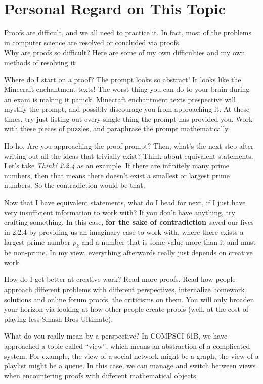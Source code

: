 \section{Personal Regard on This Topic}
Proofs are difficult, and we all need to practice it. In fact, most of the problems in computer science are resolved or concluded via proofs. \\
Why are proofs so difficult? Here are some of my own difficulties and my own methods of resolving it:
\begin{bindenum}
    \item Where do I start on a proof? The prompt looks so abstract! It looks like the Minecraft enchantment texts!
    \subitem The worst thing you can do to your brain during an exam is making it panick. Minecraft enchantment texts prespective will mystify the prompt, and possibly discourage you from approaching it. At these times, try just listing out every single thing the prompt has provided you. Work with these pieces of puzzles, and paraphrase the prompt mathematically.
    \item Ho-ho. Are you approaching the proof prompt? Then, what's the next step after writing out all the ideas that trivially exist?
    \subitem Think about equivalent statements. Let's take \textit{Think! 2.2.4} as an example. If there are infinitely many prime numbers, then that means there doesn't exist a smallest or largest prime numbers. So the contradiction would be that. 
    \item Now that I have equivalent statements, what do I head for next, if I just have very insufficient information to work with?
    \subitem If you don't have anything, try crafting something. In this case, \textbf{for the sake of contradiction} saved our lives in 2.2.4 by providing us an imaginary case to work with, where there exists a largest prime number $p_k$ and a number that is some value more than it and must be non-prime. In my view, everything afterwards really just depends on creative work.
    \item How do I get better at creative work?
    \subitem Read more proofs. Read how people approach different problems with different perspectives, internalize homework solutions and online forum proofs, the criticisms on them. You will only broaden your horizon via looking at how other people create proofs (well, at the cost of playing less Smash Bros Ultimate).
    \item What do you really mean by a perspective?
    \subitem In COMPSCI 61B, we have approached a topic called ``view'', which means an abstraction of a complicated system. For example, the view of a social network might be a graph, the view of a playlist might be a queue. In this case, we can manage and switch between views when encountering proofs with different mathematical objects. \\

\end{bindenum}
